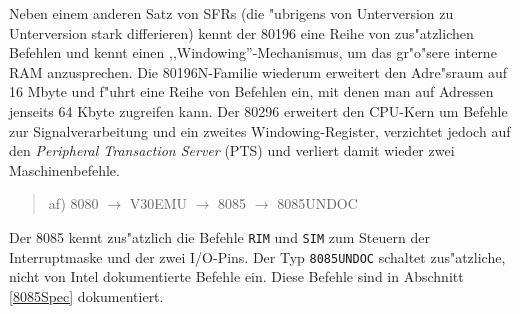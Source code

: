 \documentclass[12pt,a4paper,twoside]{report}
\newcommand{\tty}[1]{{\tt #1}}
\begin{document}
Neben einem anderen Satz von SFRs (die "ubrigens von Unterversion zu
Unterversion stark differieren) kennt der 80196 eine Reihe von
zus"atzlichen Befehlen und kennt einen ,,Windowing''-Mechanismus, um
das gr"o"sere interne RAM anzusprechen.  Die 80196N-Familie wiederum
erweitert den Adre"sraum auf 16 Mbyte und f"uhrt eine Reihe von
Befehlen ein, mit denen man auf Adressen jenseits 64 Kbyte zugreifen
kann.  Der 80296 erweitert den CPU-Kern um Befehle zur Signalverarbeitung
und ein zweites Windowing-Register, verzichtet jedoch auf den {\em
Peripheral Transaction Server} (PTS) und verliert damit wieder zwei
Maschinenbefehle.
\begin{quote}
af) 8080 $\rightarrow$ V30EMU $\rightarrow$ 8085 $\rightarrow$ 8085UNDOC
\end{quote}
Der 8085 kennt zus"atzlich die Befehle \tty{RIM} und \tty{SIM} zum Steuern der
Interruptmaske und der zwei I/O-Pins.  Der Typ {\tt 8085UNDOC} schaltet
zus"atzliche, nicht von Intel dokumentierte Befehle ein.  Diese Befehle
sind in Abschnitt \ref{8085Spec} dokumentiert.
\end{document}
